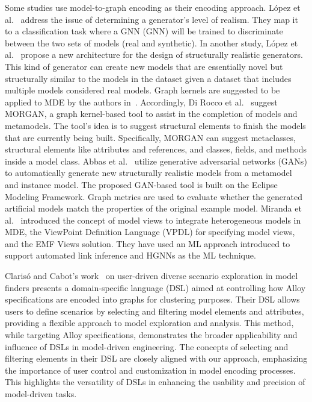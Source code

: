 \documentclass[journal,article,submit,moreauthors,technologies]{Definitions/mdpi}
\begin{document}
Some studies use model-to-graph encoding as their encoding approach. López et al.~\cite{lopez2021towards} address the issue of determining a generator's level of realism. They map it to a classification task where a GNN (GNN) will be trained to discriminate between the two sets of models (real and synthetic). In another study, López et al.~\cite{lopez2022generating} propose a new architecture for the design of structurally realistic generators. This kind of generator can create new models that are essentially novel but structurally similar to the models in the dataset given a dataset that includes multiple models considered real models. Graph kernels are suggested to be applied to MDE by the authors in~\cite{clariso2018applying}. Accordingly, Di Rocco et al.~\cite{di2021gnn} suggest MORGAN, a graph kernel-based tool to assist in the completion of models and metamodels. The tool's idea is to suggest structural elements to finish the models that are currently being built. Specifically, MORGAN can suggest metaclasses, structural elements like attributes and references, and classes, fields, and methods inside a model class.
Abbas et al.~\cite{rahimi2023towards} utilize generative adversarial networks (GANs) to automatically generate new structurally realistic models from a metamodel and instance model. The proposed GAN-based tool is built on the Eclipse Modeling Framework. Graph metrics are used to evaluate whether the generated artificial models match the properties of the original example model.
Miranda et al.~\cite{miranda2024towards} introduced the concept of model views to integrate heterogeneous models in MDE, the ViewPoint Definition Language (VPDL) for specifying model views, and the EMF Views solution. They have used an ML approach introduced to support automated link inference and HGNNs as the ML technique.

Clarisó and Cabot's work~\cite{clariso2022user} on user-driven diverse scenario exploration in model finders presents a domain-specific language (DSL) aimed at controlling how Alloy specifications are encoded into graphs for clustering purposes. Their DSL allows users to define scenarios by selecting and filtering model elements and attributes, providing a flexible approach to model exploration and analysis. This method, while targeting Alloy specifications, demonstrates the broader applicability and influence of DSLs in model-driven engineering. The concepts of selecting and filtering elements in their DSL are closely aligned with our approach, emphasizing the importance of user control and customization in model encoding processes. This highlights the versatility of DSLs in enhancing the usability and precision of model-driven tasks.
\end{document}
